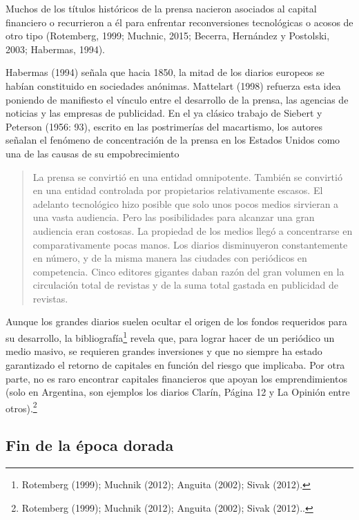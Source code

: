 Muchos de los títulos históricos de la prensa nacieron asociados al capital financiero o recurrieron a él para enfrentar reconversiones tecnológicas o acosos de otro tipo (Rotemberg, 1999; Muchnic, 2015; Becerra, Hernández y Postolski, 2003; Habermas, 1994).

Habermas (1994) señala que hacia 1850, la mitad de los diarios europeos se habían constituido en sociedades anónimas. Mattelart (1998) refuerza esta idea poniendo de manifiesto el vínculo entre el desarrollo de la prensa, las agencias de noticias y las empresas de publicidad. En el ya clásico trabajo de Siebert y Peterson (1956: 93), escrito en las postrimerías del macartismo, los autores señalan el fenómeno de concentración de la prensa en los Estados Unidos como una de las causas de su empobrecimiento

\begin{quote}
La prensa se convirtió en una entidad omnipotente. También se convirtió en una entidad controlada por propietarios relativamente escasos. El adelanto tecnológico hizo posible que solo unos pocos medios sirvieran a una vasta audiencia. Pero las posibilidades para alcanzar una gran audiencia eran costosas. La propiedad de los medios llegó a concentrarse en comparativamente pocas manos. Los diarios disminuyeron constantemente en número, y de la misma manera las ciudades con periódicos en competencia. Cinco editores gigantes daban razón del gran volumen en la circulación total de revistas y de la suma total gastada en publicidad de revistas.
\end{quote}

Aunque los grandes diarios suelen ocultar el origen de los fondos requeridos para su desarrollo, la bibliografía\footnote{Rotemberg (1999); Muchnik (2012); Anguita (2002); Sivak (2012).} revela que, para lograr hacer de un periódico un medio masivo, se requieren grandes inversiones y que no siempre ha estado garantizado el retorno de capitales en función del riesgo que implicaba. Por otra parte, no es raro encontrar capitales financieros que apoyan los emprendimientos (solo en Argentina, son ejemplos los diarios Clarín, Página 12 y La Opinión entre otros).\footnote{Rotemberg (1999); Muchnik (2012); Anguita (2002); Sivak (2012)..}

\subsection{Fin de la época dorada}

